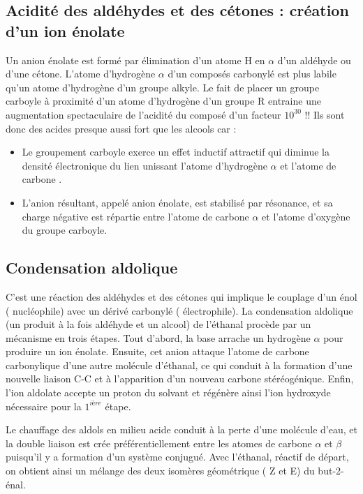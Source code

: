 \subsection{Acidité des aldéhydes et des cétones : création d'un ion énolate}

Un anion énolate est formé par élimination d'un atome H en $\alpha $ d'un aldéhyde ou d'une cétone.
L'atome d'hydrogène $\alpha$ d'un composés carbonylé est plus labile qu'un atome d'hydrogène d'un groupe alkyle.
Le fait de placer un groupe carboyle à proximité d'un atome d'hydrogène d'un groupe R entraine une augmentation spectaculaire de l'acidité du composé  d'un facteur $10^{30} $ !! Ils sont donc  des acides presque aussi fort que les alcools car :
\begin{itemize}
  \item Le groupement carboyle exerce un effet inductif attractif qui diminue la densité électronique du lien unissant l'atome d'hydrogène $ \alpha$ et l'atome de  carbone .
  \item L'anion résultant, appelé anion énolate, est stabilisé par résonance, et sa charge négative est répartie entre l'atome de carbone $ \alpha $ et l'atome d'oxygène du groupe carboyle.

\end{itemize}



\subsection{Condensation aldolique}

C'est une réaction des aldéhydes et des cétones qui implique le couplage d'un énol ( nucléophile) avec un dérivé carbonylé ( électrophile).
La condensation aldolique (un produit à la fois aldéhyde et un alcool) de l'éthanal procède par un mécanisme en trois étapes.
Tout d'abord, la base arrache un hydrogène $\alpha$ pour produire un ion énolate.
Ensuite, cet anion attaque l'atome de carbone carbonylique d'une autre molécule d'éthanal, ce qui conduit à la formation d'une nouvelle liaison C-C et à l'apparition d'un nouveau carbone stéréogénique.
Enfin, l'ion aldolate accepte un proton du solvant et régénère ainsi l'ion hydroxyde nécessaire pour la $1^{ière}$ étape.


Le chauffage des aldols en milieu acide conduit à la perte d'une molécule d'eau, et la double liaison est crée préférentiellement entre les atomes de carbone $\alpha$ et $\beta $ puisqu'il y a formation d'un système conjugué.
Avec l'éthanal, réactif de départ, on obtient ainsi un mélange des deux isomères géométrique ( Z et E) du but-2-énal.




